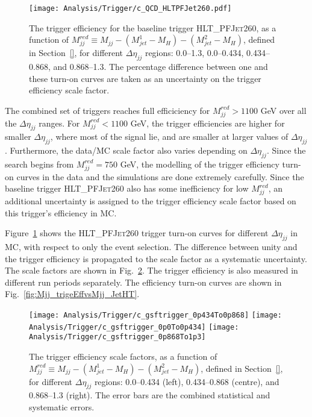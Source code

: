\begin{figure}[H]
  \begin{center}
    \texttt{[image: Analysis/Trigger/c\_QCD\_HLTPFJet260.pdf]}
  \end{center}
  \caption{The trigger efficiency for the baseline trigger \textsc{HLT\_PFJet260}, as a function of $M_{jj}^{red} \equiv M_{jj} - (M_{jet}^{1}-M_{H}) - (M_{jet}^{2}-M_{H})$, defined in Section~\ref{}, for different $\Delta\eta_{jj}$ regions: 0.0--1.3, 0.0--0.434, 0.434--0.868, and 0.868--1.3. The percentage difference between one and these turn-on curves are taken as an uncertainty on the trigger efficiency scale factor.}
  \label{fig:trigeEffvsMjj_QCDHT_HLTPFJet260_DEtabins}
\end{figure}

The combined set of triggers reaches full efficiciency for $M_{jj}^{red} > 1100$ GeV over all the $\Delta\eta_{jj}$ ranges. For $M_{jj}^{red} < 1100$ GeV, the trigger efficiencies are higher for smaller $\Delta\eta_{jj}$, where most of the signal lie, and are smaller at larger values of $\Delta\eta_{jj}$. Furthermore, the data/MC scale factor also varies depending on $\Delta\eta_{jj}$. Since the search begins from $M_{jj}^{red} = 750$ GeV, the modelling of the trigger efficiency turn-on curves in the data and the simulations are done extremely carefully. Since the baseline trigger \textsc{HLT\_PFJet260} also has some inefficiency for low $M_{jj}^{red}$, an additional uncertainty is assigned to the trigger efficiency scale factor based on this trigger's efficiency  in MC.

Figure~\ref{fig:trigeEffvsMjj_QCDHT_HLTPFJet260_DEtabins} shows the \textsc{HLT\_PFJet260} trigger turn-on curves for different $\Delta\eta_{jj}$ in MC, with respect to only the event selection. The difference between unity and the trigger efficiency is propagated to the scale factor as a systematic uncertainty. The scale factors are shown in Fig.~\ref{fig:trigeEffSFvsMjj_JetHT_DetaBins}. The trigger efficiency is also measured in different run periods separately. The efficiency turn-on curves are shown in Fig.~\ref{fig:Mjj_trigeEffvsMjj_JetHT}.

\begin{figure}[H]
  \begin{center}
    \texttt{[image: Analysis/Trigger/c\_gsftrigger\_0p434To0p868]}
    \texttt{[image: Analysis/Trigger/c\_gsftrigger\_0p0To0p434]}
    \texttt{[image: Analysis/Trigger/c\_gsftrigger\_0p868To1p3]}
  \end{center}
  \caption{The trigger efficiency scale factors, as a function of $M_{jj}^{red} \equiv M_{jj} - (M_{jet}^{1}-M_{H}) - (M_{jet}^{2}-M_{H})$, defined in Section~\ref{}, for different $\Delta\eta_{jj}$ regions: 0.0--0.434 (left), 0.434--0.868 (centre), and 0.868--1.3 (right). The error bars are the combined statistical and systematic errors.}
  \label{fig:trigeEffSFvsMjj_JetHT_DetaBins}
\end{figure}


